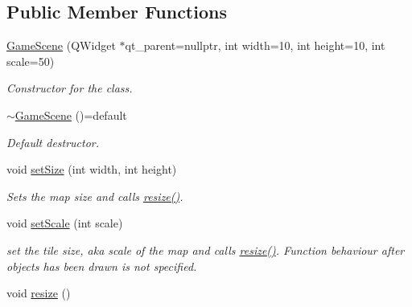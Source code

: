 \subsection*{Public Member Functions}
\begin{DoxyCompactItemize}
\item 
\hyperlink{classGameScene_ac79cb09c68f4792ee46af017fa611655}{Game\-Scene} (Q\-Widget $\ast$qt\-\_\-parent=nullptr, int width=10, int height=10, int scale=50)
\begin{DoxyCompactList}\small\item\em Constructor for the class. \end{DoxyCompactList}\item 
\hypertarget{classGameScene_acc18fe047b4c994237711f3bc3c5b957}{\hyperlink{classGameScene_acc18fe047b4c994237711f3bc3c5b957}{$\sim$\-Game\-Scene} ()=default}\label{classGameScene_acc18fe047b4c994237711f3bc3c5b957}

\begin{DoxyCompactList}\small\item\em Default destructor. \end{DoxyCompactList}\item 
void \hyperlink{classGameScene_a52aa6944e1827819bf202cc522aa1f34}{set\-Size} (int width, int height)
\begin{DoxyCompactList}\small\item\em Sets the map size and calls \hyperlink{classGameScene_af0961456d7d4195f165e46b3f8ee416c}{resize()}. \end{DoxyCompactList}\item 
void \hyperlink{classGameScene_acf8e952cc950bfde99e0302ee0450437}{set\-Scale} (int scale)
\begin{DoxyCompactList}\small\item\em set the tile size, aka scale of the map and calls \hyperlink{classGameScene_af0961456d7d4195f165e46b3f8ee416c}{resize()}. Function behaviour after objects has been drawn is not specified. \end{DoxyCompactList}\item 
\hypertarget{classGameScene_af0961456d7d4195f165e46b3f8ee416c}{void \hyperlink{classGameScene_af0961456d7d4195f165e46b3f8ee416c}{resize} ()}\label{classGameScene_af0961456d7d4195f165e46b3f8ee416c}


\end{DoxyCompactItemize}
